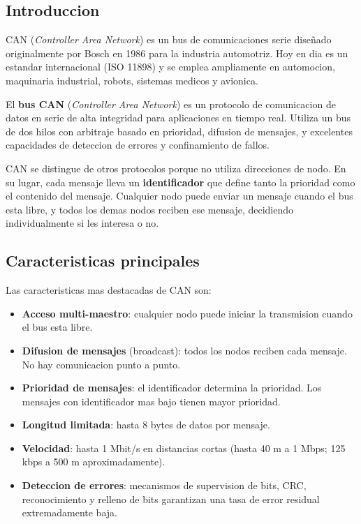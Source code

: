 \subsection{Introduccion}

CAN (\textit{Controller Area Network}) es un bus de comunicaciones serie
diseñado originalmente por Bosch en 1986 para la industria automotriz. Hoy en
dia es un estandar internacional (ISO 11898) y se emplea ampliamente en
automocion, maquinaria industrial, robots, sistemas medicos y avionica.

\begin{definicion}[CAN]
El \textbf{bus CAN} (\textit{Controller Area Network}) es un protocolo de
comunicacion de datos en serie de alta integridad para aplicaciones en tiempo
real. Utiliza un bus de dos hilos con arbitraje basado en prioridad, difusion de
mensajes, y excelentes capacidades de deteccion de errores y confinamiento de
fallos.
\end{definicion}

CAN se distingue de otros protocolos porque no utiliza direcciones de nodo.
En su lugar, cada mensaje lleva un \textbf{identificador} que define tanto la
prioridad como el contenido del mensaje. Cualquier nodo puede enviar un
mensaje cuando el bus esta libre, y todos los demas nodos reciben ese mensaje,
decidiendo individualmente si les interesa o no.

\subsection{Caracteristicas principales}

Las caracteristicas mas destacadas de CAN son:

\begin{itemize}
    \item \textbf{Acceso multi-maestro}: cualquier nodo puede iniciar la
    transmision cuando el bus esta libre.
    \item \textbf{Difusion de mensajes} (broadcast): todos los nodos reciben cada
    mensaje. No hay comunicacion punto a punto.
    \item \textbf{Prioridad de mensajes}: el identificador determina la prioridad.
    Los mensajes con identificador mas bajo tienen mayor prioridad.
    \item \textbf{Longitud limitada}: hasta 8 bytes de datos por mensaje.
    \item \textbf{Velocidad}: hasta 1 Mbit/s en distancias cortas (hasta 40 m a 1
    Mbps; 125 kbps a 500 m aproximadamente).
    \item \textbf{Deteccion de errores}: mecanismos de supervision de bits,
    CRC, reconocimiento y relleno de bits garantizan una tasa de error
    residual extremadamente baja.
\end{itemize}

